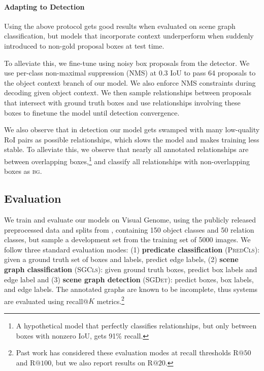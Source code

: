 \documentclass[10pt,twocolumn,letterpaper]{article}
\newcommand{\bg}{\textsc{bg}}  %
\begin{document}
\paragraph{Adapting to Detection}
Using the above protocol gets good results when evaluated on scene graph classification, but models that incorporate context underperform when suddenly introduced to non-gold proposal boxes at test time.

To alleviate this, we fine-tune using noisy box proposals from the detector.
We use per-class non-maximal suppression (NMS) \cite{NMSCITATION} at 0.3 IoU to pass 64 proposals to the object context branch of our model. We also enforce NMS constraints during decoding given object context.
We then sample relationships between proposals that intersect with ground truth boxes and use relationships involving these boxes to finetune the model until detection convergence.

We also observe that in detection our model gets swamped with many low-quality RoI pairs as possible relationships, which slows the model and makes training less stable. To alleviate this, we observe that nearly all annotated relationships are between overlapping boxes,\footnote{A hypothetical model that perfectly classifies relationships, but only between boxes with nonzero IoU, gets 91\% recall.} and classify all relationships with non-overlapping boxes as \bg.

\subsection{Evaluation}\label{subsec:setup:evaluation}
We train and evaluate our models on Visual Genome, using the publicly released preprocessed data and splits from \cite{xu_scene_2017}, containing 150 object classes and 50 relation classes, but sample a development set from the training set of 5000 images. %
We follow three standard evaluation modes: (1) \textbf{predicate classification} (\textsc{PredCls}): given a ground truth set of boxes and labels, predict edge labels, (2) \textbf{scene graph classification} (\textsc{SGCls}): given ground truth boxes, predict box labels and edge label and (3) \textbf{scene graph detection} (\textsc{SGDet}): predict boxes, box labels, and edge labels.
The annotated graphs are known to be incomplete,
thus systems are evaluated using recall@$K$ metrics.\footnote{Past work has considered these evaluation modes at recall thresholds R$@50$ and R$@100$, but we also report results on R$@20$.}%
\end{document}
